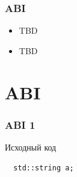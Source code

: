 \documentclass{beamer}
\begin{document}
\begin{frame}[fragile]
\frametitle{ABI}
\begin{itemize}
\item<+-> TBD
\item<+-> TBD
\end{itemize}
\end{frame}

\section{ABI}

\begin{frame}[fragile]
\frametitle{ABI 1}
Исходный код 
\begin{verbatim}
  std::string a;
\end{verbatim}
\end{frame}
\end{document}

